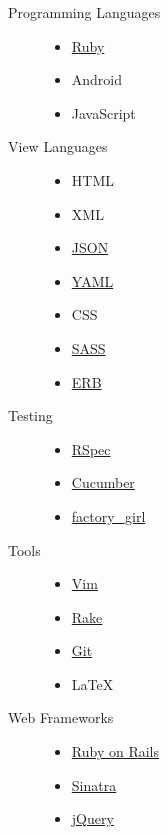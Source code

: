 \begin{description}
  \item[Programming Languages] \hfill
    \begin{itemize}
      \item \href{https://www.ruby-lang.org/}{Ruby}
      \item Android
      \item JavaScript
    \end{itemize}
  \item[View Languages] \hfill
    \begin{itemize}
      \item HTML
      \item XML
      \item \href{http://json.org}{JSON}
      \item \href{http://www.yaml.org}{YAML}
      \item CSS
      \item \href{http://sass-lang.com}{SASS}
      \item \href{http://ruby-doc.org/stdlib/libdoc/erb/rdoc/ERB.html}{ERB}
    \end{itemize}
  \item[Testing] \hfill
    \begin{itemize}
      \item \href{http://rspec.info}{RSpec}
      \item \href{http://cukes.info}{Cucumber}
      \item \href{https://github.com/thoughtbot/factory_girl}{factory\_girl}
    \end{itemize}
  \item[Tools] \hfill
    \begin{itemize}
      \item \href{http://www.vim.org}{Vim}
      \item \href{https://github.com/ruby/rake}{Rake}
      \item \href{http://git-scm.com}{Git}
      \item {\fb \LaTeX}\setmainfont[SmallCapsFont=Fontin-SmallCaps.otf]{Fontin.otf}
    \end{itemize}
  \item[Web Frameworks] \hfill
    \begin{itemize}
      \item \href{http://rubyonrails.org}{Ruby on Rails}
      \item \href{http://www.sinatrarb.com}{Sinatra}
      \item \href{http://jquery.com}{jQuery}

\end{itemize}
\end{description}
